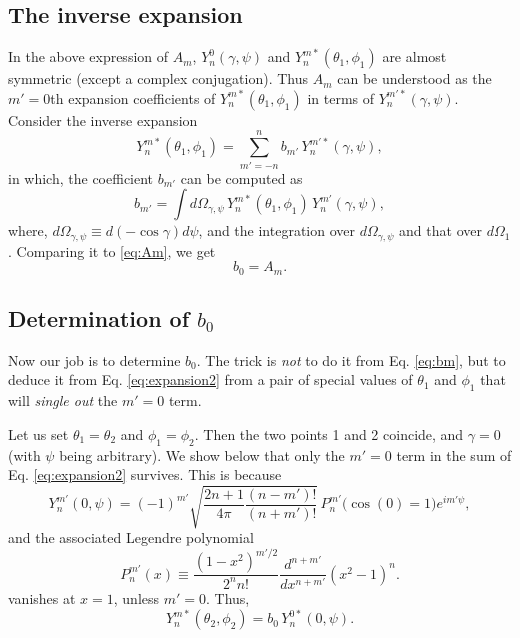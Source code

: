 \documentclass[11pt]{article}
\begin{document}
\subsection{The inverse expansion}



In the above expression of $A_m$,
$Y_n^0(\gamma, \psi)$ and $Y_n^{m*}(\theta_1, \phi_1)$
are almost symmetric (except a complex conjugation).
%
Thus $A_m$
can be understood as the $m'=0$th expansion coefficients
of $Y_n^{m*}(\theta_1, \phi_1)$
in terms of $Y_n^{m'*}(\gamma, \psi)$.
%
Consider the inverse expansion
\begin{equation}
  Y_n^{m*}(\theta_1, \phi_1)
=
  \sum_{m' = -n}^n b_{m'} \,Y_n^{m'*}(\gamma, \psi),
  \label{eq:expansion2}
\end{equation}
in which,
the coefficient $b_{m'}$ can be computed as
\begin{equation}
  b_{m'}
=
  \int d \Omega_{\gamma,\psi} \,
  Y_n^{m*}(\theta_1, \phi_1) \,
  Y_n^{m'}(\gamma, \psi),
  \label{eq:bm}
\end{equation}
where, $d\Omega_{\gamma, \psi} \equiv d(-\cos\gamma) d\psi$,
and the integration over $d\Omega_{\gamma, \psi}$
and that over $d\Omega_1$.
Comparing it to \eqref{eq:Am}, we get
\begin{equation}
  b_0 = A_m.
  \label{eq:b0Am}
\end{equation}



\subsection{Determination of $b_0$}


Now our job is to determine $b_0$.
The trick is \emph{not} to do it from Eq. \eqref{eq:bm},
but to deduce it from Eq. \eqref{eq:expansion2}
from a pair of special values of $\theta_1$ and $\phi_1$
that will \emph{single out} the $m' = 0$ term.

Let us set $\theta_1 = \theta_2$ and $\phi_1 = \phi_2$.
Then the two points 1 and 2 coincide,
and $\gamma = 0$ (with $\psi$ being arbitrary).
%
We show below that only the $m' = 0$ term in the sum
of Eq. \eqref{eq:expansion2} survives.
%
This is because
\begin{equation}
  Y_n^{m'}(0, \psi)
=
  (-1)^{m'}
  \sqrt{
    \frac{ 2 n + 1 } { 4 \pi }
    \frac{ (n - m')! } { (n + m')! }
  }
  \,
  P_{n}^{m'}\bigl( \cos(0) = 1 \bigr) e^{i m' \psi},
  \label{eq:Ynm}
\end{equation}
and the associated Legendre polynomial
\begin{equation}
  P_{n}^{m'}(x)
\equiv
  \frac{ (1 - x^2)^{m'/2} } { 2^{n} n! }
  \frac{ d^{n+m'} } { d x^{n+m'} } (x^2 - 1)^{n}.
  \label{eq:Pnm}
\end{equation}
vanishes at $x = 1$, unless $m' = 0$.
Thus,
\[
Y_n^{m*}(\theta_2, \phi_2)
=
b_0 \, Y_n^{0*}(0, \psi).
\]
\end{document}
